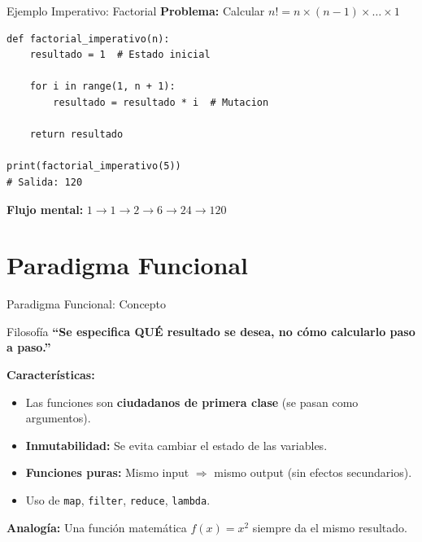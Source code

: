 \documentclass[aspectratio=169]{beamer}
\begin{document}
\begin{frame}[fragile]{Ejemplo Imperativo: Factorial}
    \textbf{Problema:} Calcular $n! = n \times (n-1) \times \ldots \times 1$
    \vspace{0.3cm}
    
    \begin{lstlisting}[title=Factorial Imperativo]
def factorial_imperativo(n):
    resultado = 1  # Estado inicial
    
    for i in range(1, n + 1):
        resultado = resultado * i  # Mutacion
    
    return resultado

print(factorial_imperativo(5))
# Salida: 120
    \end{lstlisting}
    
    \vspace{0.3cm}
    \textbf{Flujo mental:} $1 \rightarrow 1 \rightarrow 2 \rightarrow 6 \rightarrow 24 \rightarrow 120$
\end{frame}

\section{Paradigma Funcional}

\begin{frame}{Paradigma Funcional: Concepto}
    \begin{exampleblock}{Filosofía}
        \textbf{``Se especifica QUÉ resultado se desea, no cómo calcularlo paso a paso.''}
    \end{exampleblock}
    \vspace{0.3cm}
    
    \textbf{Características:}
    \begin{itemize}
        \item Las funciones son \textbf{ciudadanos de primera clase} (se pasan como argumentos).
        \item \textbf{Inmutabilidad:} Se evita cambiar el estado de las variables.
        \item \textbf{Funciones puras:} Mismo input $\Rightarrow$ mismo output (sin efectos secundarios).
        \item Uso de \texttt{map}, \texttt{filter}, \texttt{reduce}, \texttt{lambda}.
    \end{itemize}
    \vspace{0.3cm}
    
    \textbf{Analogía:} Una función matemática $f(x) = x^2$ siempre da el mismo resultado.
\end{frame}
\end{document}

